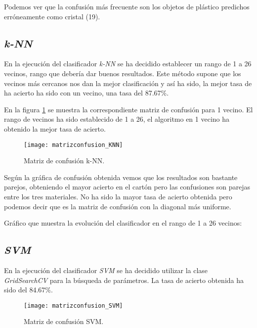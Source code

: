 Podemos ver que la confusión más frecuente son los objetos de plástico predichos erróneamente como cristal (19).

\clearpage

\subsection{\textit{k-NN}}

En la ejecución del clasificador \textit{k-NN} se ha decidido establecer un rango de 1 a 26 vecinos, rango que debería dar buenos resultados. Este método supone que los vecinos más cercanos nos dan la mejor clasificación y así ha sido, la mejor tasa de ha acierto ha sido con un vecino, una tasa del 87.67\%.

En la figura \ref{fig:matrizconfusion_KNN} se muestra la correspondiente matriz de confusión para 1 vecino. El rango de vecinos ha sido establecido de 1 a 26, el algoritmo en 1 vecino ha obtenido la mejor tasa de acierto.

\begin{figure}[h]
\begin{center}
	\texttt{[image: matrizconfusion\_KNN]}
	\caption{Matriz de confusión k-NN.}
	\label{fig:matrizconfusion_KNN}
\end{center}
\end{figure}

Según la gráfica de confusión obtenida vemos que los resultados son bastante parejos, obteniendo el mayor acierto en el cartón pero las confusiones son parejas entre los tres materiales. No ha sido la mayor tasa de acierto obtenida pero podemos decir que es la matriz de confusión con la diagonal más uniforme.

\clearpage

Gráfico que muestra la evolución del clasificador en el rango de 1 a 26 vecinos:


\clearpage

\subsection{\textit{SVM}}

En la ejecución del clasificador \textit{SVM} se ha decidido utilizar la clase \textit{GridSearchCV} para la búsqueda de parámetros. La tasa de acierto obtenida ha sido del 84.67\%.

\begin{figure}[h]
\begin{center}
	\texttt{[image: matrizconfusion\_SVM]}
	\caption{Matriz de confusión SVM.}
	\label{fig:matrizconfusion_SVM}
\end{center}
\end{figure}


